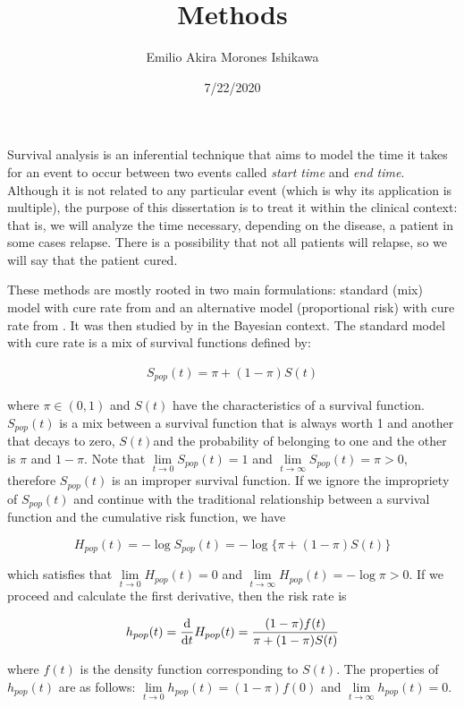 \documentclass[
]{article}
\title{Methods}
\author{Emilio Akira Morones Ishikawa}
\date{7/22/2020}
\begin{document}
\maketitle

Survival analysis is an inferential technique that aims to model the
time it takes for an event to occur between two events called
\emph{start time} and \emph{end time}. Although it is not related to any
particular event (which is why its application is multiple), the purpose
of this dissertation is to treat it within the clinical context: that
is, we will analyze the time necessary, depending on the disease, a
patient in some cases relapse. There is a possibility that not all
patients will relapse, so we will say that the patient cured.

These methods are mostly rooted in two main formulations: standard (mix)
model with cure rate from \citet{Berkson1952} and an alternative model
(proportional risk) with cure rate from \citet{Hoang1996a}. It was then
studied by \citet{Chen1999a} in the Bayesian context. The standard model
with cure rate \citep{Berkson1952} is a mix of survival functions
defined by:

\begin{align} \label{mixS}
S_{pop}(t)=\pi+(1-\pi)S(t)
\end{align}

where \(\pi \in (0,1)\) and \(S (t)\) have the characteristics of a
survival function. \(S_ {pop} (t)\) is a mix between a survival function
that is always worth 1 and another that decays to zero, \(S (t)\)and the
probability of belonging to one and the other is \(\pi\) and
\(1 - \pi\). Note that \(\lim \limits_{t \to 0} S_{pop} (t) = 1\) and
\(\lim \limits_{t \to \infty} S_ {pop} (t) = \pi> 0\), therefore
\(S_ {pop} (t)\) is an improper survival function. If we ignore the
impropriety of \(S_ {pop} (t)\) and continue with the traditional
relationship between a survival function and the cumulative risk
function, we have

\[
H_{pop}(t)=-\log{S_{pop}(t)}=-\log\{\pi+(1-\pi)S(t)\}
\]

which satisfies that \(\lim \limits_{t \to0} H_{pop} (t) = 0\) and
\(\lim \limits_{t \to \infty} H_{pop} (t) = - \log {\pi }> 0\). If we
proceed and calculate the first derivative, then the risk rate is

\[
h_{pop}(t) = \dv{}{t}H_{pop}(t)=\frac{(1-\pi)f(t)}{\pi+(1-\pi)S(t)}
\]

where \(f (t)\) is the density function corresponding to \(S (t)\). The
properties of \(h_{pop} (t)\) are as follows:
\(\lim \limits_{t \to 0} h_{pop} (t) = (1- \pi) f (0)\) and
\(\lim \limits_{t \to \infty} h_{pop} (t) = 0\).
\end{document}
